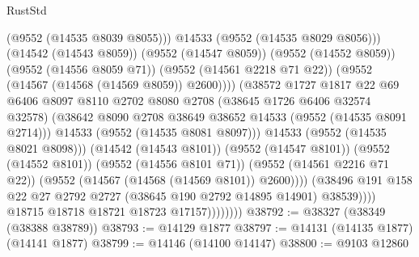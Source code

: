 \begin{lexlean}{RustStd}
\begin{coremodule}
                                        (@9552 (@14535 @8039 @8055)))
                                      @14533
                                      (@9552 (@14535 @8029 @8056)))
                                    (@14542 (@14543 @8059))
                                    (@9552 (@14547 @8059))
                                    (@9552 (@14552 @8059))
                                    (@9552 (@14556 @8059 @71))
                                    (@9552 (@14561 @2218 @71 @22))
                                    (@9552 (@14567 (@14568 (@14569 @8059)) @2600))))
                                (@38572
                                  @1727
                                  @1817
                                  @22
                                  @69
                                  @6406
                                  @8097
                                  @8110
                                  @2702
                                  @8080
                                  @2708
                                  (@38645 @1726 @6406 @32574 @32578)
                                  (@38642
                                    @8090
                                    @2708
                                    @38649
                                    @38652
                                    @14533
                                    (@9552 (@14535 @8091 @2714)))
                                  @14533
                                  (@9552 (@14535 @8081 @8097)))
                                @14533
                                (@9552 (@14535 @8021 @8098)))
                              (@14542 (@14543 @8101))
                              (@9552 (@14547 @8101))
                              (@9552 (@14552 @8101))
                              (@9552 (@14556 @8101 @71))
                              (@9552 (@14561 @2216 @71 @22))
                              (@9552 (@14567 (@14568 (@14569 @8101)) @2600))))
                          (@38496
                            @191
                            @158
                            @22
                            @27
                            @2792
                            @2727
                            (@38645 @190 @2792 @14895 @14901)
                            @38539))))
                    @18715
                    @18718
                    @18721
                    @18723
                    @17157))))))))
@38792 := @38327 (@38349 (@38388 @38789))
@38793 := @14129 @1877
@38797 := @14131 (@14135 @1877) (@14141 @1877)
@38799 := @14146 (@14100 @14147)
@38800 := @9103 @12860

\end{coremodule}
\end{lexlean}
